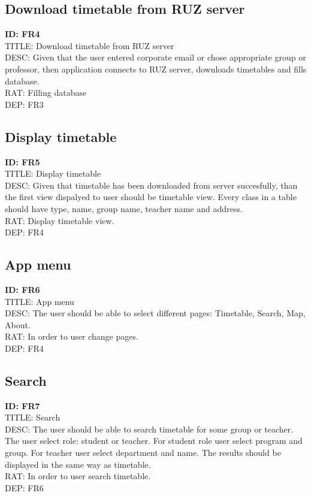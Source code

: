 \documentclass{scrreprt}
\begin{document}
\subsection{Download timetable from RUZ server}
\textbf{ID: FR4}\\
TITLE: Download timetable from RUZ server\\
DESC: Given that the user entered corporate email or chose appropriate group or professor, then application connects to RUZ server,
downloads timetables and fills database.\\
RAT: Filling database\\
DEP: FR3

\subsection{Display timetable}
\textbf{ID: FR5}\\
TITLE: Display timetable\\
DESC: Given that timetable has been downloaded from server succesfully, than the first view dispalyed to user
should be timetable view. Every class in a table should have type, name, group name, teacher name and address.\\
RAT: Display timetable view.\\
DEP: FR4

\subsection{App menu}
\textbf{ID: FR6}\\
TITLE: App menu\\
DESC: The user should be able to select different pages: Timetable, Search, Map, About.\\
RAT: In order to user change pages.\\
DEP: FR4

\subsection{Search}
\textbf{ID: FR7}\\
TITLE: Search\\
DESC: The user should be able to search timetable for some group or teacher. The user select role: student or teacher.
For student role user select program and group. For teacher user select department and name.
The results should be displayed in the same way as timetable.\\
RAT: In order to user search timetable.\\
DEP: FR6
\end{document}
